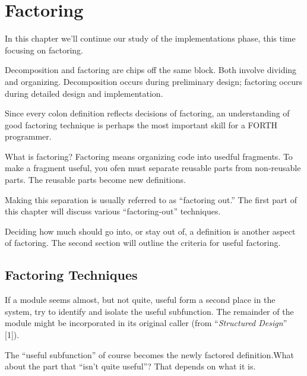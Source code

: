 




\chapter{Factoring}

In this chapter we'll continue our study of the implementations phase, this time focusing on factoring.

Decomposition and factoring are chips off the same block. Both involve dividing and organizing. Decomposition occurs during preliminary design; factoring occurs during detailed design and implementation.

Since every colon definition reflects decisions of factoring, an understanding of good factoring technique is perhaps the most important skill for a FORTH programmer.

What is factoring? Factoring means organizing code into usedful fragments. To make a fragment useful, you ofen must separate reusable parts from non-reusable parts. The reusable parts become new definitions.

Making this separation is usually referred to as ``factoring out.'' The first part of this chapter will discuss various ``factoring-out'' techniques.

Deciding how much should go into, or stay out of, a definition is another aspect of factoring. The second section will outline the criteria for useful factoring.

\section{Factoring Techniques}

\begin{tfquot}
If a module seems almost, but not quite, useful form a second place in the system, try to identify and isolate the useful subfunction. The remainder of the module might be incorporated in its original caller (from ``\emph{Structured Design}'' [1]).
\end{tfquot}
The ``useful subfunction'' of course becomes the newly factored definition.What about the part that ``isn't quite useful''? That depends on what it is.

